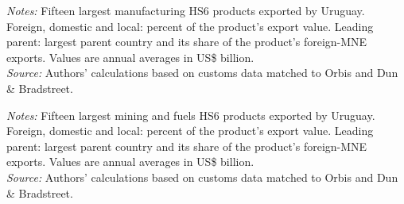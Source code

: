 \documentclass[11pt,a4paper]{article}
\begin{document}
\begin{table}[H]\centering\footnotesize%
  \caption{Uruguay, Manufacturing: Fifteen Largest Export Products}%
  \label{tab:c_hs6_URY_manufacturing}%
  \par\vspace{3pt}%
  \begin{minipage}{0.95\textwidth}\footnotesize %
  \textit{Notes:} Fifteen largest manufacturing HS6 products exported by Uruguay. Foreign, domestic and local: percent of the product's export value. Leading parent: largest parent country and its share of the product's foreign-MNE exports. Values are annual averages in US\$ billion.\\[3pt]%
  \textit{Source:} Authors' calculations based on customs data matched to Orbis and Dun \& Bradstreet.%
  \end{minipage}%
  \end{table}
\begin{table}[H]\centering\footnotesize%
  \caption{Uruguay, Mining and Fuels: Fifteen Largest Export Products}%
  \label{tab:c_hs6_URY_mining}%
  \par\vspace{3pt}%
  \begin{minipage}{0.95\textwidth}\footnotesize %
  \textit{Notes:} Fifteen largest mining and fuels HS6 products exported by Uruguay. Foreign, domestic and local: percent of the product's export value. Leading parent: largest parent country and its share of the product's foreign-MNE exports. Values are annual averages in US\$ billion.\\[3pt]%
  \textit{Source:} Authors' calculations based on customs data matched to Orbis and Dun \& Bradstreet.%
  \end{minipage}%
  \end{table}
\end{document}
